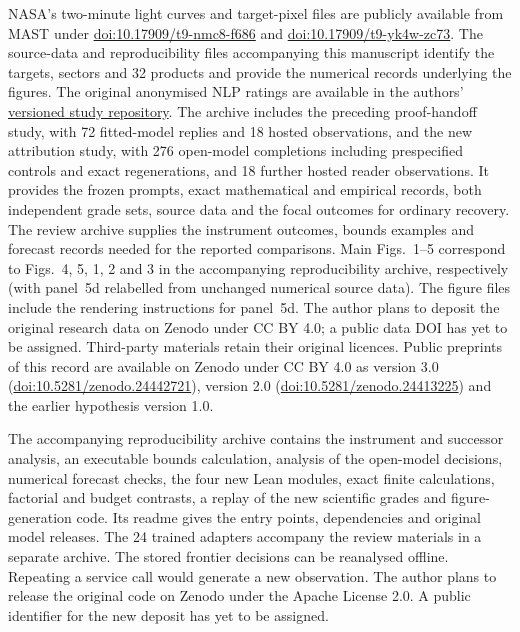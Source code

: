 NASA's two-minute light curves and target-pixel files are publicly available from MAST under \href{https://doi.org/10.17909/t9-nmc8-f686}{doi:10.17909/t9-nmc8-f686} and \href{https://doi.org/10.17909/t9-yk4w-zc73}{doi:10.17909/t9-yk4w-zc73}. The source-data and reproducibility files accompanying this manuscript identify the targets, sectors and 32 products and provide the numerical records underlying the figures. The original anonymised NLP ratings are available in the authors' \href{https://github.com/NoviScl/AI-Researcher/tree/e5dd05a90bcadb436c07283c2f429367c6e525d3}{versioned study repository}.\cite{SI26} The archive includes the preceding proof-handoff study, with 72 fitted-model replies and 18 hosted observations, and the new attribution study, with 276 open-model completions including prespecified controls and exact regenerations, and 18 further hosted reader observations. It provides the frozen prompts, exact mathematical and empirical records, both independent grade sets, source data and the focal outcomes for ordinary recovery. The review archive supplies the instrument outcomes, bounds examples and forecast records needed for the reported comparisons. Main Figs.~1--5 correspond to Figs.~4, 5, 1, 2 and 3 in the accompanying reproducibility archive, respectively (with panel~5d relabelled from unchanged numerical source data). The figure files include the rendering instructions for panel~5d. The author plans to deposit the original research data on Zenodo under CC BY 4.0; a public data DOI has yet to be assigned. Third-party materials retain their original licences. Public preprints of this record are available on Zenodo under CC BY 4.0 as version 3.0 (\href{https://doi.org/10.5281/zenodo.24442721}{doi:10.5281/zenodo.24442721}), version 2.0 (\href{https://doi.org/10.5281/zenodo.24413225}{doi:10.5281/zenodo.24413225}) and the earlier hypothesis version 1.0.\cite{PRE}

The accompanying reproducibility archive contains the instrument and successor analysis, an executable bounds calculation, analysis of the open-model decisions, numerical forecast checks, the four new Lean modules, exact finite calculations, factorial and budget contrasts, a replay of the new scientific grades and figure-generation code. Its readme gives the entry points, dependencies and original model releases. The 24 trained adapters accompany the review materials in a separate archive. The stored frontier decisions can be reanalysed offline. Repeating a service call would generate a new observation. The author plans to release the original code on Zenodo under the Apache License 2.0. A public identifier for the new deposit has yet to be assigned.


